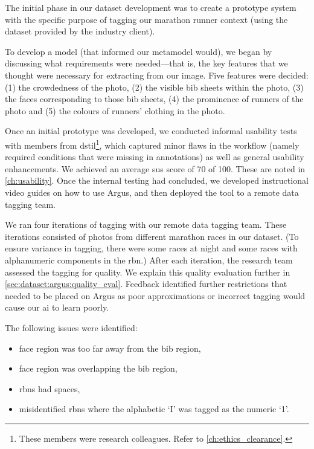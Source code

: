 The initial phase in our dataset development was to create a prototype system with the specific purpose of tagging our marathon runner context (using the dataset provided by the industry client).


To develop a model (that informed our metamodel would), we began by discussing what requirements were needed---that is, the key features that we thought were necessary for extracting from our image. Five features were decided: (1) the crowdedness of the photo, (2) the visible bib sheets within the photo, (3) the faces corresponding to those bib sheets, (4) the prominence of runners of the photo and (5) the colours of runners' clothing in the photo.

Once an initial prototype was developed, we conducted informal usability tests with members from \gls{dstil}\footnote{These members were research colleagues. Refer to \cref{ch:ethics_clearance}.}, which captured minor flaws in the workflow (namely required conditions that were missing in annotations) as well as general usability enhancements. We achieved an average \gls{sus} score \citep{Jordan:1996wa} of 70 of 100. These are noted in \cref{ch:usability}. Once the internal testing had concluded, we developed instructional video guides on how to use Argus, and then deployed the tool to a remote data tagging team.

We ran four iterations of tagging with our remote data tagging team. These iterations consisted of photos from different marathon races in our dataset. (To ensure variance in tagging, there were some races at night and some races with alphanumeric components in the \gls{rbn}.) After each iteration, the research team assessed the tagging for quality. We explain this quality evaluation further in \cref{sec:dataset:argus:quality_eval}. Feedback identified further restrictions that needed to be placed on Argus as poor approximations or incorrect tagging would cause our \gls{ai} to learn poorly. 

The following issues were identified:

\begin{itemize}
  \item face region was too far away from the bib region,
  \item face region was overlapping the bib region,
  \item \glspl{rbn} had spaces,
  \item misidentified \glspl{rbn} where the alphabetic `I' was tagged as the numeric `1'.
\end{itemize}

